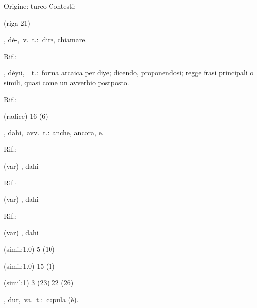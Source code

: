 \begin{glossario}{Origine: turco}
Contesti:
\begin{subvocedue}
\item[(riga 21)] 
\end{subvocedue}
\item[{\color{colorlowref}\spzrl{d.eB}},] {\sf dė-},\ v.\ t.:\ dire, chiamare.
\begin{subvocedue}
\item[Rif.:] 
\end{subvocedue}
\begin{subvocedue}
\item[\subglossariobullet] , {\sf dėyü},\ \ t.:\ forma arcaica per diye; dicendo, proponendosi; regge frasi principali o simili, quasi come un avverbio postposto.
\begin{subvocedue}
\item[Rif.:] 
\end{subvocedue}
\item[(radice)]   16 (6)
\end{subvocedue}
\item[{\color{colorlowref}\spzrl{da_h.Y}},] {\sf dahi},\ avv.\ t.:\ anche, ancora, e.
\begin{subvocedue}
\item[Rif.:] 
\end{subvocedue}
\begin{subvocedue}
\item[(var)] , {\sf dahi}\begin{subvocedue}
\item[Rif.:] 
\end{subvocedue}
\item[(var)] , {\sf dahi}\begin{subvocedue}
\item[Rif.:] 
\end{subvocedue}
\item[(var)] , {\sf dahi}\item[(simil:1.0)]   5 (10)
\item[(simil:1.0)]   15 (1)
\item[(simil:1)]   3 (23) 22 (26)
\end{subvocedue}
\item[{\color{colorlowref}\spzrl{dur}},] {\sf dur},\ va.\ t.:\ copula (è).

\end{glossario}
